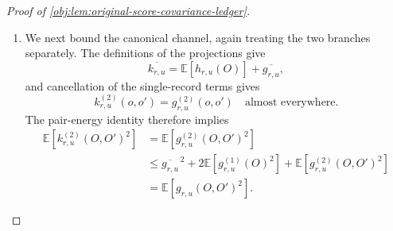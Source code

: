 \documentclass[11pt]{article}
\begin{document}
\begin{proof}[Proof of \cref{obj:lem:original-score-covariance-ledger}]
\begin{enumerate}
Substitution into the conditional pair formula gives the outcome-coefficient envelope
\[
\left|
\mathbb E[\mathscr P_{0,u}[D_j,T_j](o,O')]
\right|
\le
\frac12|f_u(X(o))|
\left(d_j+a_j|\mathfrak m_{0,T_j}(o)|\right).
\]
Since
\[
\frac14(d_j+a_j|\mathfrak m_{0,T_j}|)^2
\le
\frac12(d_j^2+a_j^2\mathfrak m_{0,T_j}^2),
\]
conditioning on \(X\) gives
\[
\mathbb E\!\left[
\left\{
\mathbb E[\mathscr P_{0,u}[D_j,T_j](O,O')\mid O]
\right\}^{\!2}
\right]
\le
\frac12(d_j^2+a_j^2V_j)\|u\|_2^2.
\]
For the treatment coefficient,
\(\overline{\mathfrak m}_{1,T_j}=e_P\) and
\(|\mathfrak m_{1,T_j}|\le1\), so
\[
\left|
\mathbb E[\mathscr P_{1,u}[D_j,T_j](o,O')]
\right|
\le a_j|f_u(X(o))|.
\]
Applying the same square-envelope inequality with constant term \(2a_j\) and zero mark term yields
\[
\mathbb E\!\left[
\left\{
\mathbb E[\mathscr P_{1,u}[D_j,T_j](O,O')\mid O]
\right\}^{\!2}
\right]
\le2a_j^2\|u\|_2^2.
\]
All \(a_j,d_j\) are nonnegative and \(V_j\ge1\). The two coefficient estimates fit the common bound because
\[
\frac12(d_j^2+a_j^2V_j)
\le\{2(d_j+a_j\sqrt{V_j})\}^2,
\qquad
2a_j^2
\le\{2(d_j+a_j\sqrt{V_j})\}^2.
\]
Define the nonnegative increment sum and conditional-pair budget by
\[
\mathcal S_{\mathrm{inc}}
=
\sum_{j=1}^{L}(d_j+a_j\sqrt{V_j}),
\qquad
B_{g,\mathrm{multi}}
=
\sqrt{V_0}+2\mathcal S_{\mathrm{inc}}.
\]
The initial projection estimate at rank \(M\), followed by the triangle inequality for the finite increment sum in \(L_2(P)\), gives
\[
\begin{aligned}
\left\|
\mathbb E[g_{r,u}(O,O')\mid O]
\right\|_{L_2(P)}
&\le
\sqrt{V_0}\|u\|_2
+
\sum_{j=1}^{L}2(d_j+a_j\sqrt{V_j})\|u\|_2\\
&=
B_{g,\mathrm{multi}}\|u\|_2.
\end{aligned}
\]
This includes \(L=0\), when the sum is zero. The singleton estimate for the augmented kernel now gives
\[
\begin{aligned}
4\operatorname{Var}_P(k_{r,u}^{(1)})
&\le
(B_h+2B_{g,\mathrm{multi}})^2\|u\|_2^2\\
&=
(4\sqrt{V_0}+4\mathcal S_{\mathrm{inc}})^2\|u\|_2^2\\
&\le
(16\sqrt{V_0}+8\mathcal S_{\mathrm{inc}})^2\|u\|_2^2
=
L_1^2\|u\|_2^2.
\end{aligned}
\]

\item We next bound the canonical channel, again treating the two branches separately. The definitions of the projections give
\[
\overline{k_{r,u}}
=
\mathbb E[h_{r,u}(O)]+\overline{g_{r,u}},
\]
and cancellation of the single-record terms gives
\[
k_{r,u}^{(2)}(o,o')=g_{r,u}^{(2)}(o,o')
\quad\text{almost everywhere}.
\]
The pair-energy identity therefore implies
\[
\begin{aligned}
\mathbb E[k_{r,u}^{(2)}(O,O')^2]
&=
\mathbb E[g_{r,u}^{(2)}(O,O')^2]\\
&\le
\overline{g_{r,u}}^{\,2}
+
2\mathbb E[g_{r,u}^{(1)}(O)^2]
+
\mathbb E[g_{r,u}^{(2)}(O,O')^2]\\
&=
\mathbb E[g_{r,u}(O,O')^2].
\end{aligned}
\]


\end{enumerate}
\end{proof}
\end{document}
